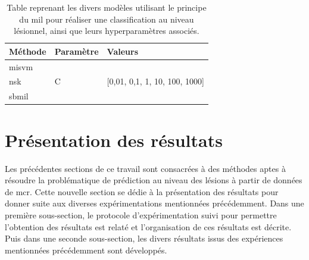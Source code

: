\begin{table}[H]
    \centering
    \begin{tabular}{lll}
    \toprule
    \textbf{Méthode}    & \textbf{Paramètre}& \textbf{Valeurs}                                  \\ \midrule
    \gls{misvm}         & \multirow{3}{*}{C}& \multirow{3}{*}{[0,01, 0,1, 1, 10, 100, 1000]}    \\ \cline{1-1}
    \gls{nsk}           &                   &                                                   \\ \cline{1-1} 
    \gls{sbmil}         &                   &                                                   \\ \bottomrule 
    \end{tabular}    
    \caption{Table reprenant les divers modèles utilisant le principe du \gls{mil} pour réaliser une classification au niveau lésionnel, ainsi que leurs hyperparamètres associés.}
    \label{tab:patient_decision_weak_hyperparameters}
\end{table}\par
\clearpage

\section{Présentation des résultats}
Les précédentes sections de ce travail sont consacrées à des méthodes aptes à résoudre la problématique de prédiction au niveau des lésions à partir de données de \gls{mcr}. Cette nouvelle section se dédie à la présentation des résultats pour donner suite aux diverses expérimentations mentionnées précédemment. Dans une première sous-section, le protocole d'expérimentation suivi pour permettre l'obtention des résultats est relaté et l'organisation de ces résultats est décrite. Puis dans une seconde sous-section, les divers résultats issus des expériences mentionnées précédemment sont développés.\par

